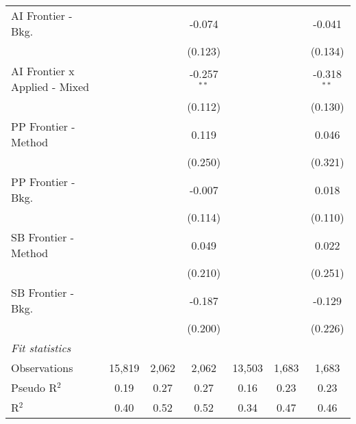 \begin{tabular}{lcccccc}
   AI Frontier - Bkg.            &         &                & -0.074        &              &              & -0.041\\   
                                 &         &                & (0.123)       &              &              & (0.134)\\   
   AI Frontier x Applied - Mixed &         &                & -0.257$^{**}$ &              &              & -0.318$^{**}$\\   
                                 &         &                & (0.112)       &              &              & (0.130)\\   
   PP Frontier - Method          &         &                & 0.119         &              &              & 0.046\\   
                                 &         &                & (0.250)       &              &              & (0.321)\\   
   PP Frontier - Bkg.            &         &                & -0.007        &              &              & 0.018\\   
                                 &         &                & (0.114)       &              &              & (0.110)\\   
   SB Frontier - Method          &         &                & 0.049         &              &              & 0.022\\   
                                 &         &                & (0.210)       &              &              & (0.251)\\   
   SB Frontier - Bkg.            &         &                & -0.187        &              &              & -0.129\\   
                                 &         &                & (0.200)       &              &              & (0.226)\\   
   \midrule
   \emph{Fit statistics}\\
   Observations                  & 15,819  & 2,062          & 2,062         & 13,503       & 1,683        & 1,683\\  
   Pseudo R$^2$                  & 0.19    & 0.27           & 0.27          & 0.16         & 0.23         & 0.23\\  
   R$^2$                         & 0.40    & 0.52           & 0.52          & 0.34         & 0.47         & 0.46\\  
   

\end{tabular}
